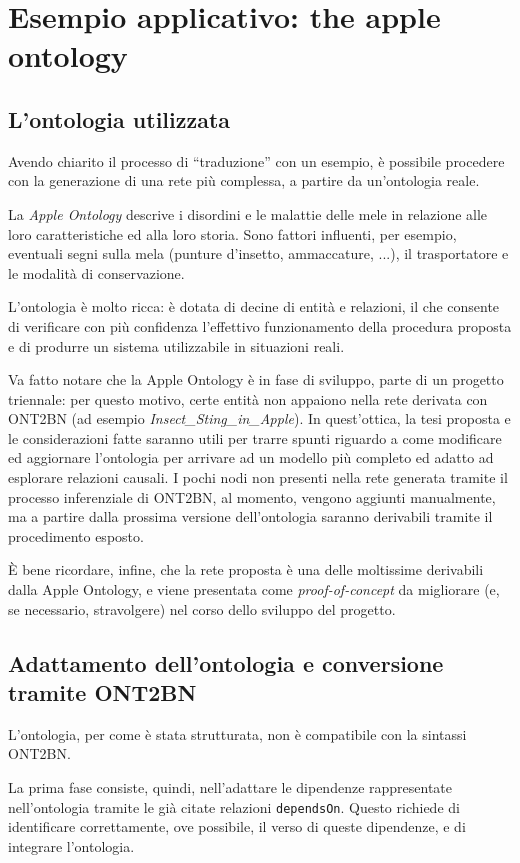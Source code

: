 \chapter{Esempio applicativo: the apple ontology}
\section*{L'ontologia utilizzata}
Avendo chiarito il processo di ``traduzione'' con un esempio, è possibile procedere con la generazione di una rete più complessa, a partire da un'ontologia reale.

La \textit{Apple Ontology} descrive i disordini e le malattie delle mele in relazione alle loro caratteristiche ed alla loro storia. Sono fattori influenti, per esempio, eventuali segni sulla mela (punture d'insetto, ammaccature, ...), il trasportatore e le modalità di conservazione.

L'ontologia è molto ricca: è dotata di decine di entità e relazioni, il che consente di verificare con più confidenza l'effettivo funzionamento della procedura proposta e di produrre un sistema utilizzabile in situazioni reali.

Va fatto notare che la Apple Ontology è in fase di sviluppo, parte di un progetto triennale: per questo motivo, certe entità non appaiono nella rete derivata con ONT2BN (ad esempio \textit{Insect\_Sting\_in\_Apple}). In quest'ottica, la tesi proposta e le considerazioni fatte saranno utili per trarre spunti riguardo a come modificare ed aggiornare l'ontologia per arrivare ad un modello più completo ed adatto ad esplorare relazioni causali. I pochi nodi non presenti nella rete generata tramite il processo inferenziale di ONT2BN, al momento, vengono aggiunti manualmente, ma a partire dalla prossima versione dell'ontologia saranno derivabili tramite il procedimento esposto.

È bene ricordare, infine, che la rete proposta è una delle moltissime derivabili dalla Apple Ontology, e viene presentata come \textit{proof-of-concept} da migliorare (e, se necessario, stravolgere) nel corso dello sviluppo del progetto.

\clearpage
\section{Adattamento dell'ontologia e conversione tramite ONT2BN}
L'ontologia, per come è stata strutturata, non è compatibile con la sintassi ONT2BN. 

La prima fase consiste, quindi, nell'adattare le dipendenze rappresentate nell'ontologia tramite le già citate relazioni \texttt{dependsOn}. Questo richiede di identificare correttamente, ove possibile, il verso di queste dipendenze, e di integrare l'ontologia.

